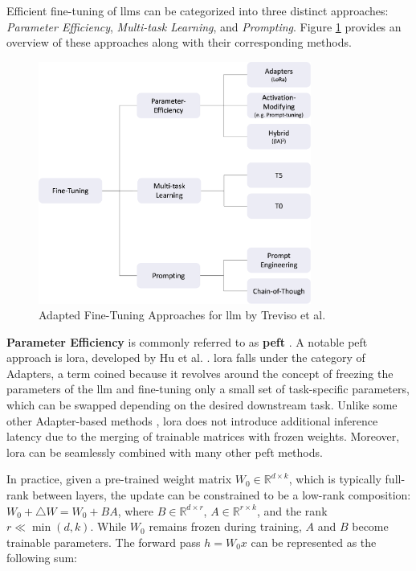 Efficient fine-tuning of \gls{llm}s can be categorized into three distinct approaches: \textit{Parameter Efficiency}, \textit{Multi-task Learning}, and \textit{Prompting}. Figure \ref{fig:llm_fine_tuning} provides an overview of these approaches along with their corresponding methods.

\begin{figure}
    \centering
    \includegraphics[width=0.8\textwidth]{Grafiken/fine_tuning_approaches.png}
    \caption{Adapted Fine-Tuning Approaches for \gls{llm} by Treviso et al. \cite{treviso_efficient_2023}}
    \label{fig:llm_fine_tuning}
\end{figure}

\textbf{Parameter Efficiency} is commonly referred to as \textbf{\gls{peft}} \cite{noauthor_peft_nodate}. A notable \gls{peft} approach is \gls{lora}, developed by Hu et al. \cite{hu_lora_nodate}. \gls{lora} falls under the category of Adapters, a term coined because it revolves around the concept of freezing the parameters of the \gls{llm} and fine-tuning only a small set of task-specific parameters, which can be swapped depending on the desired downstream task. Unlike some other Adapter-based methods \cite{houlsby_parameter-efficient_2019}, \gls{lora} does not introduce additional inference latency due to the merging of trainable matrices with frozen weights. Moreover, \gls{lora} can be seamlessly combined with many other \gls{peft} methods.

In practice, given a pre-trained weight matrix \(W_0 \in \mathbb{R}^{d \times k}\), which is typically full-rank between layers, the update can be constrained to be a low-rank composition: \(W_0 + \triangle W = W_0 + BA\), where \(B \in \mathbb{R}^{d \times r}\), \(A \in \mathbb{R}^{r \times k}\), and the rank \(r \ll \min(d, k)\). While \(W_0\) remains frozen during training, \(A\) and \(B\) become trainable parameters. The forward pass \(h = W_0x\) can be represented as the following sum:

